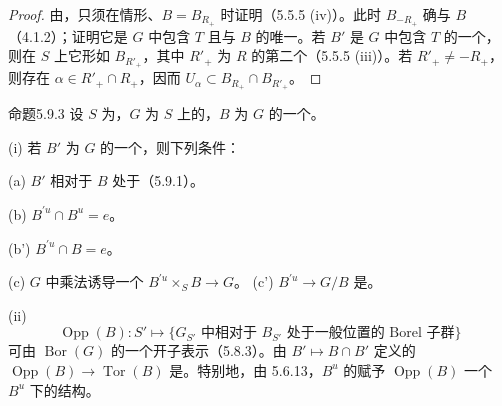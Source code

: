 \begin{proof}
由，只须在情形、$B=B_{R_+}$ 时证明（5.5.5 (iv)）。此时 $B_{-R_+}$ 确与 $B$ （4.1.2）；证明它是 $G$ 中包含 $T$ 且与 $B$ 的唯一。若 $B'$ 是 $G$ 中包含 $T$ 的一个，则在 $S$ 上它形如 $B_{R'_+}$，其中 $R'_+$ 为 $R$ 的第二个（5.5.5 (iii)）。若 $R'_+\ne-R_+$，则存在 $\alpha\in R'_+\cap R_+$，因而 $U_\alpha\subset B_{R_+}\cap B_{R'_+}$。
\end{proof}
\begin{SGAresult}{命题}{5.9.3}
设 $S$ 为，$G$ 为 $S$ 上的，$B$ 为 $G$ 的一个。

(i) 若 $B'$ 为 $G$ 的一个，则下列条件：

(a) $B'$ 相对于 $B$ 处于（5.9.1）。

(b) $B^{\prime u}\cap B^u=e$。

(b') $B^{\prime u}\cap B=e$。

(c) $G$ 中乘法诱导一个 $B^{\prime u}\times_SB\to G$。
(c')  $B^{\prime u}\to G/B$ 是。

(ii) 
\[\operatorname{Opp}(B):S'\longmapsto
\{G_{S'}\text{ 中相对于 }B_{S'}\text{ 处于一般位置的 Borel 子群}\}\]
可由 $\operatorname{Bor}(G)$ 的一个开子表示（5.8.3）。由 $B'\mapsto B\cap B'$ 定义的 $\operatorname{Opp}(B)\to\operatorname{Tor}(B)$ 是。特别地，由 5.6.13，$B^u$ 的赋予 $\operatorname{Opp}(B)$ 一个 $B^u$ 下的结构。
\end{SGAresult}
